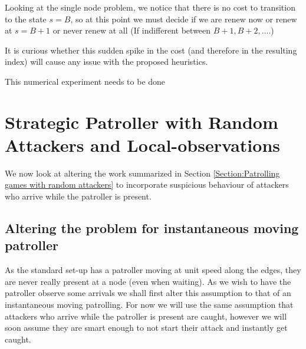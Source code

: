 \documentclass[a4paper,10pt]{article}
\theoremstyle{definition}
\theoremstyle{definition}
\theoremstyle{remark}
\theoremstyle{definition}
\begin{document}
Looking at the single node problem, we notice that there is no cost to transition to the state $s=B$, so at this point we must decide if we are renew now or renew at $s=B+1$ or never renew at all (If indifferent between $B+1,B+2,....$)

It is curious whether this sudden spike in the cost (and therefore in the resulting index) will cause any issue with the proposed heuristics.

\begin{Huge}
This numerical experiment needs to be done
\end{Huge}


\section{Strategic Patroller with Random Attackers and Local-observations}
\label{Section:Patrolling games with random attackers and local-observations}
We now look at altering the work summarized in Section \ref{Section:Patrolling games with random attackers} to incorporate suspicious behaviour of attackers who arrive while the patroller is present.

\subsection{Altering the problem for instantaneous moving patroller}
As the standard set-up has a patroller moving at unit speed along the edges, they are never really present at a node (even when waiting). As we wish to have the patroller observe some arrivals we shall first alter this assumption to that of an instantaneous moving patrolling. For now we will use the same assumption that attackers who arrive while the patroller is present are caught, however we will soon assume they are smart enough to not start their attack and instantly get caught.
\end{document}
